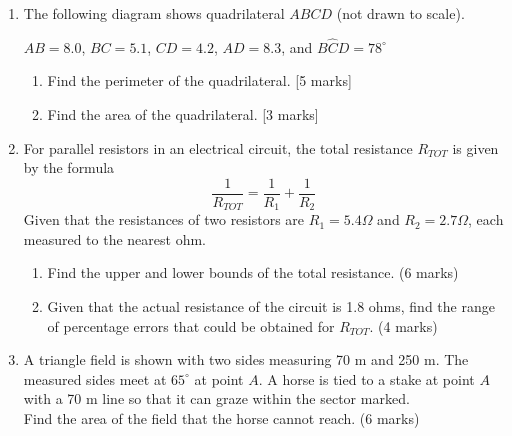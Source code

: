 \documentclass[12pt, twoside]{article}
\begin{document}
\begin{enumerate}
\newpage
\item The following diagram shows quadrilateral $ABCD$ (not drawn to scale).
  \begin{center}
    \end{center} 
    $AB=8.0$, $BC=5.1$, $CD=4.2$, $AD=8.3$, and $B\hat{C}D=78^\circ$
    \begin{enumerate}
      \item Find the perimeter of the quadrilateral. \hfill [5 marks]
      \item Find the area of the quadrilateral. \hfill [3 marks]
    \end{enumerate}

\item For parallel resistors in an electrical circuit, the total resistance $R_{TOT}$ is given by the formula 
$$ \frac{1}{R_{TOT}} = \frac{1}{R_1} + \frac{1}{R_2}$$
Given that the resistances of two resistors are $R_1 = 5.4 \Omega$ and $R_2 = 2.7 \Omega$, each measured to the nearest ohm.
\begin{enumerate}
  \item Find the upper and lower bounds of the total resistance. \hfill (6 marks)
  \item Given that the actual resistance of the circuit is 1.8 ohms, find the range of percentage errors that could be obtained for $R_{TOT}$. \hfill (4 marks)
\end{enumerate}

\item A triangle field is shown with two sides measuring 70 m and 250 m. The measured sides meet at $65^\circ$ at point $A$. A horse is tied to a stake at point $A$ with a 70 m line so that it can graze within the sector marked. \\[0.25cm]
Find the area of the field that the horse cannot reach. \hfill (6 marks)
  \begin{center}
    \end{center}




\end{enumerate}
\end{document}
